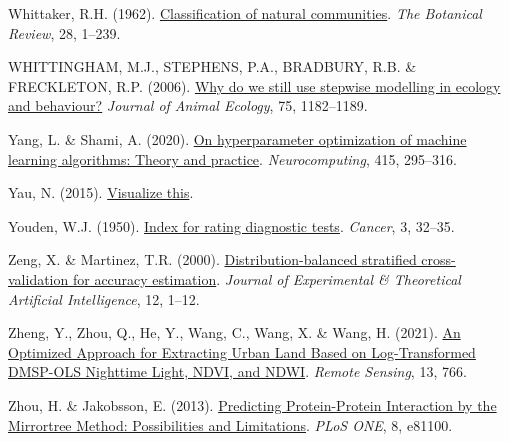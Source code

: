 \documentclass[
  letterpaper,
]{scrbook}
\newlength{\cslhangindent}
\newenvironment{CSLReferences}[2] %
 {\begin{list}{}{%
  \setlength{\itemindent}{0pt}
  \setlength{\leftmargin}{0pt}
  \setlength{\parsep}{0pt}
  \ifodd #1
   \setlength{\leftmargin}{\cslhangindent}
   \setlength{\itemindent}{-1\cslhangindent}
  \fi
  \setlength{\itemsep}{#2\baselineskip}}}
 {\end{list}}
\begin{document}
\begin{CSLReferences}{1}{0}
Whittaker, R.H. (1962).
\href{https://doi.org/10.1007/bf02860872}{Classification of natural
communities}. \emph{The Botanical Review}, 28, 1--239.

WHITTINGHAM, M.J., STEPHENS, P.A., BRADBURY, R.B. \& FRECKLETON, R.P.
(2006). \href{https://doi.org/10.1111/j.1365-2656.2006.01141.x}{Why do
we still use stepwise modelling in ecology and behaviour?} \emph{Journal
of Animal Ecology}, 75, 1182--1189.

Yang, L. \& Shami, A. (2020).
\href{https://doi.org/10.1016/j.neucom.2020.07.061}{On hyperparameter
optimization of machine learning algorithms: Theory and practice}.
\emph{Neurocomputing}, 415, 295--316.

Yau, N. (2015). \href{https://doi.org/10.1002/9781118722213}{Visualize
this}.

Youden, W.J. (1950).
\href{https://doi.org/10.1002/1097-0142(1950)3:1\%3C32::aid-cncr2820030106\%3E3.0.co;2-3}{Index
for rating diagnostic tests}. \emph{Cancer}, 3, 32--35.

Zeng, X. \& Martinez, T.R. (2000).
\href{https://doi.org/10.1080/095281300146272}{Distribution-balanced
stratified cross-validation for accuracy estimation}. \emph{Journal of
Experimental \& Theoretical Artificial Intelligence}, 12, 1--12.

Zheng, Y., Zhou, Q., He, Y., Wang, C., Wang, X. \& Wang, H. (2021).
\href{https://doi.org/10.3390/rs13040766}{An Optimized Approach for
Extracting Urban Land Based on Log-Transformed DMSP-OLS Nighttime Light,
NDVI, and NDWI}. \emph{Remote Sensing}, 13, 766.

Zhou, H. \& Jakobsson, E. (2013).
\href{https://doi.org/10.1371/journal.pone.0081100}{Predicting
Protein-Protein Interaction by the Mirrortree Method: Possibilities and
Limitations}. \emph{PLoS ONE}, 8, e81100.

\end{CSLReferences}


\backmatter
\end{document}
